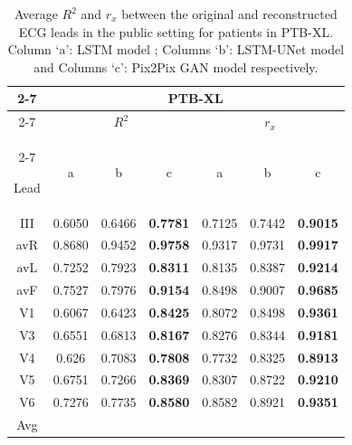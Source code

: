 

\begin{table}[t]
\begin{center}
\begin{footnotesize}
\renewcommand{\arraystretch}{1.1}
\renewcommand{\tabcolsep}{7.5pt}

\caption{Average $R^2$ and $r_x$ between the original and reconstructed ECG leads in the public setting for patients in PTB-XL. Column `a': LSTM model \cite{lstm}; Columns `b': LSTM-UNet model and Columns `c': Pix2Pix GAN model respectively.}

\begin{tabular}{|c|ccc|ccc|}
\hline
\cline{2-7}
& \multicolumn{6}{c|}{PTB-XL} \\

\cline{2-7}
& \multicolumn{3}{c|}{$R^2$}
& \multicolumn{3}{c|}{$r_x$} \\
\cline{2-7}

Lead & a & b & c & a & b & c \\
\hline
III &  0.6050 & 0.6466 & \textbf{0.7781} &  0.7125 &  0.7442 & \textbf{0.9015} \\
avR &  0.8680 & 0.9452 & \textbf{0.9758} & 0.9317 & 0.9731 & \textbf{0.9917} \\
avL &  0.7252 & 0.7923 & \textbf{0.8311} & 0.8135 & 0.8387 & \textbf{0.9214}
   \\
avF & 0.7527 & 0.7976 & \textbf{0.9154} & 0.8498 & 0.9007 & \textbf{0.9685}
   \\
V1 & 0.6067 & 0.6423 & \textbf{0.8425} & 0.8072 & 0.8498 & \textbf{0.9361}
   \\
V3 & 0.6551 & 0.6813 & \textbf{0.8167} & 0.8276 & 0.8344 & \textbf{0.9181}
   \\
V4 & 0.626 & 0.7083 & \textbf{0.7808} & 0.7732 & 0.8325 & \textbf{0.8913}
   \\
V5 & 0.6751 & 0.7266 & \textbf{0.8369} & 0.8307 & 0.8722 & \textbf{0.9210}
   \\
V6 & 0.7276 & 0.7735 & \textbf{0.8580} & 0.8582 & 0.8921 & \textbf{0.9351}
   \\

\hline
Avg  &  &  &   &  &  &   \\


\hline
\end{tabular}
\label{ptbdb_incart_pgg}
\end{footnotesize}

\end{center}
\end{table}
